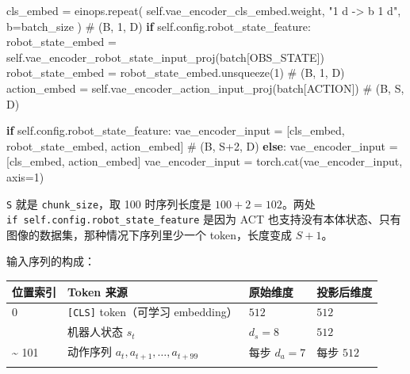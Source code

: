 \documentclass[
  chinese,
]{ctexart}
\newenvironment{Shaded}{\begin{snugshade}}{\end{snugshade}}
\newcommand{\CommentTok}[1]{\textcolor[rgb]{0.37,0.37,0.37}{#1}}
\newcommand{\ControlFlowTok}[1]{\textcolor[rgb]{0.00,0.23,0.31}{\textbf{#1}}}
\newcommand{\DecValTok}[1]{\textcolor[rgb]{0.68,0.00,0.00}{#1}}
\newcommand{\NormalTok}[1]{\textcolor[rgb]{0.00,0.23,0.31}{#1}}
\newcommand{\OperatorTok}[1]{\textcolor[rgb]{0.37,0.37,0.37}{#1}}
\newcommand{\StringTok}[1]{\textcolor[rgb]{0.13,0.47,0.30}{#1}}
\newcommand{\VariableTok}[1]{\textcolor[rgb]{0.07,0.07,0.07}{#1}}
\begin{document}
\begin{Shaded}
\begin{Highlighting}[]
\NormalTok{            cls\_embed }\OperatorTok{=}\NormalTok{ einops.repeat(}
                \VariableTok{self}\NormalTok{.vae\_encoder\_cls\_embed.weight, }\StringTok{"1 d {-}\textgreater{} b 1 d"}\NormalTok{, b}\OperatorTok{=}\NormalTok{batch\_size}
\NormalTok{            )  }\CommentTok{\# (B, 1, D)}
            \ControlFlowTok{if} \VariableTok{self}\NormalTok{.config.robot\_state\_feature:}
\NormalTok{                robot\_state\_embed }\OperatorTok{=} \VariableTok{self}\NormalTok{.vae\_encoder\_robot\_state\_input\_proj(batch[OBS\_STATE])}
\NormalTok{                robot\_state\_embed }\OperatorTok{=}\NormalTok{ robot\_state\_embed.unsqueeze(}\DecValTok{1}\NormalTok{)  }\CommentTok{\# (B, 1, D)}
\NormalTok{            action\_embed }\OperatorTok{=} \VariableTok{self}\NormalTok{.vae\_encoder\_action\_input\_proj(batch[ACTION])  }\CommentTok{\# (B, S, D)}

            \ControlFlowTok{if} \VariableTok{self}\NormalTok{.config.robot\_state\_feature:}
\NormalTok{                vae\_encoder\_input }\OperatorTok{=}\NormalTok{ [cls\_embed, robot\_state\_embed, action\_embed]  }\CommentTok{\# (B, S+2, D)}
            \ControlFlowTok{else}\NormalTok{:}
\NormalTok{                vae\_encoder\_input }\OperatorTok{=}\NormalTok{ [cls\_embed, action\_embed]}
\NormalTok{            vae\_encoder\_input }\OperatorTok{=}\NormalTok{ torch.cat(vae\_encoder\_input, axis}\OperatorTok{=}\DecValTok{1}\NormalTok{)}
\end{Highlighting}
\end{Shaded}

\texttt{S} 就是 \texttt{chunk\_size}，取 100 时序列长度是
\(100 + 2 = 102\)。两处 \texttt{if\ self.config.robot\_state\_feature}
是因为 ACT 也支持没有本体状态、只有图像的数据集，那种情况下序列里少一个
token，长度变成 \(S+1\)。

输入序列的构成：

\begin{center}
\begin{tabular}{@{}>{\raggedright\arraybackslash}p{} >{\raggedright\arraybackslash}p{} >{\raggedright\arraybackslash}p{} >{\raggedright\arraybackslash}p{}@{}}
\toprule\noalign{}
位置索引 & Token 来源 & 原始维度 & 投影后维度 \\
\midrule\noalign{}
0 & \texttt{{[}CLS{]}} token（可学习 embedding） & \(512\) & \(512\) \\
1 & 机器人状态 \(s_t\) & \(d_s = 8\) & \(512\) \\
2 \textasciitilde{} 101 & 动作序列 \(a_t, a_{t+1}, \ldots, a_{t+99}\) & 每步 \(d_a = 7\) & 每步 \(512\) \\
\bottomrule\noalign{}
\end{tabular}
\end{center}
\end{document}
